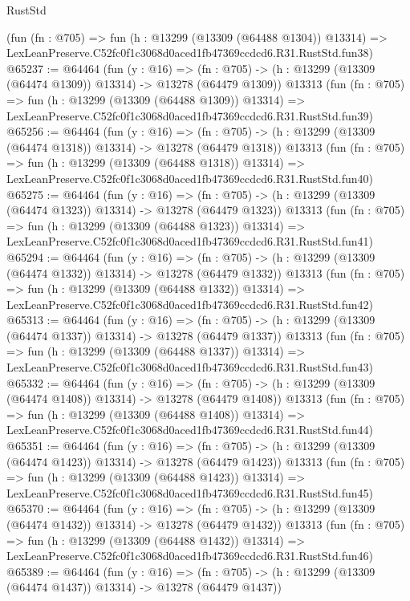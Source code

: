 \begin{lexlean}{RustStd}
\begin{coremodule}
    (fun (fn : @705) =>
    fun (h : @13299 (@13309 (@64488 @1304)) @13314) =>
    LexLeanPreserve.C52fc0f1c3068d0aced1fb47369ccdcd6.R31.RustStd.fun38)
@65237 := @64464
    (fun (y : @16) =>
    (fn : @705) -> (h : @13299 (@13309 (@64474 @1309)) @13314) -> @13278 (@64479 @1309))
    @13313
    (fun (fn : @705) =>
    fun (h : @13299 (@13309 (@64488 @1309)) @13314) =>
    LexLeanPreserve.C52fc0f1c3068d0aced1fb47369ccdcd6.R31.RustStd.fun39)
@65256 := @64464
    (fun (y : @16) =>
    (fn : @705) -> (h : @13299 (@13309 (@64474 @1318)) @13314) -> @13278 (@64479 @1318))
    @13313
    (fun (fn : @705) =>
    fun (h : @13299 (@13309 (@64488 @1318)) @13314) =>
    LexLeanPreserve.C52fc0f1c3068d0aced1fb47369ccdcd6.R31.RustStd.fun40)
@65275 := @64464
    (fun (y : @16) =>
    (fn : @705) -> (h : @13299 (@13309 (@64474 @1323)) @13314) -> @13278 (@64479 @1323))
    @13313
    (fun (fn : @705) =>
    fun (h : @13299 (@13309 (@64488 @1323)) @13314) =>
    LexLeanPreserve.C52fc0f1c3068d0aced1fb47369ccdcd6.R31.RustStd.fun41)
@65294 := @64464
    (fun (y : @16) =>
    (fn : @705) -> (h : @13299 (@13309 (@64474 @1332)) @13314) -> @13278 (@64479 @1332))
    @13313
    (fun (fn : @705) =>
    fun (h : @13299 (@13309 (@64488 @1332)) @13314) =>
    LexLeanPreserve.C52fc0f1c3068d0aced1fb47369ccdcd6.R31.RustStd.fun42)
@65313 := @64464
    (fun (y : @16) =>
    (fn : @705) -> (h : @13299 (@13309 (@64474 @1337)) @13314) -> @13278 (@64479 @1337))
    @13313
    (fun (fn : @705) =>
    fun (h : @13299 (@13309 (@64488 @1337)) @13314) =>
    LexLeanPreserve.C52fc0f1c3068d0aced1fb47369ccdcd6.R31.RustStd.fun43)
@65332 := @64464
    (fun (y : @16) =>
    (fn : @705) -> (h : @13299 (@13309 (@64474 @1408)) @13314) -> @13278 (@64479 @1408))
    @13313
    (fun (fn : @705) =>
    fun (h : @13299 (@13309 (@64488 @1408)) @13314) =>
    LexLeanPreserve.C52fc0f1c3068d0aced1fb47369ccdcd6.R31.RustStd.fun44)
@65351 := @64464
    (fun (y : @16) =>
    (fn : @705) -> (h : @13299 (@13309 (@64474 @1423)) @13314) -> @13278 (@64479 @1423))
    @13313
    (fun (fn : @705) =>
    fun (h : @13299 (@13309 (@64488 @1423)) @13314) =>
    LexLeanPreserve.C52fc0f1c3068d0aced1fb47369ccdcd6.R31.RustStd.fun45)
@65370 := @64464
    (fun (y : @16) =>
    (fn : @705) -> (h : @13299 (@13309 (@64474 @1432)) @13314) -> @13278 (@64479 @1432))
    @13313
    (fun (fn : @705) =>
    fun (h : @13299 (@13309 (@64488 @1432)) @13314) =>
    LexLeanPreserve.C52fc0f1c3068d0aced1fb47369ccdcd6.R31.RustStd.fun46)
@65389 := @64464
    (fun (y : @16) =>
    (fn : @705) -> (h : @13299 (@13309 (@64474 @1437)) @13314) -> @13278 (@64479 @1437))

\end{coremodule}
\end{lexlean}
